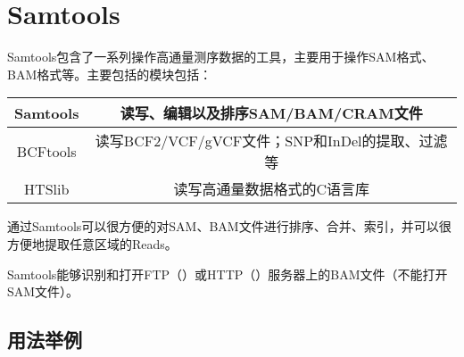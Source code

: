 \chapter{Samtools}\label{software:samtools}

Samtools包含了一系列操作高通量测序数据的工具，主要用于操作SAM格式、BAM格式等。主要包括的模块包括：

\noindent \begin{table}[ht]
	\centering
	\begin{tabular}{|c|c|}
		\hline 
		Samtools & 读写、编辑以及排序SAM/BAM/CRAM文件 \\ 
		\hline 
		BCFtools & 读写BCF2/VCF/gVCF文件；SNP和InDel的提取、过滤等 \\ 
		\hline 
		HTSlib & 读写高通量数据格式的C语言库 \\ 
		\hline 
	\end{tabular} 
\end{table}

通过Samtools可以很方便的对SAM、BAM文件进行排序、合并、索引，并可以很方便地提取任意区域的Reads。

Samtools能够识别和打开FTP（）或HTTP（）服务器上的BAM文件（不能打开SAM文件）。

\section{用法举例}

